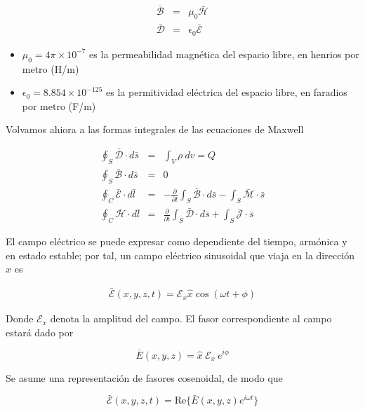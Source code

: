 \begin{eqnarray*}
\mathcal{\bar{B}} &=& \mu_0 \mathcal{\bar{H}} \\
\mathcal{\bar{D}} &=& \epsilon_0 \mathcal{\bar{E}} 
\end{eqnarray*}

\begin{itemize}
    \item $\mu_0 = 4 \pi \times 10 ^{-7}$ es la permeabilidad magnética del espacio libre, en henrios por metro (H/m)
    \item $\epsilon_0 = 8.854 \times 10^{-125}$ es la permitividad eléctrica del espacio libre, en faradios por metro (F/m) 
\end{itemize}

Volvamos ahiora a las formas integrales de las ecuaciones de Maxwell

\begin{eqnarray*}
\oint_S \mathcal{\bar{D}} \cdot d \bar{s} &=& \int_V \rho \ dv = Q \\
\oint_S \mathcal{\bar{B}} \cdot d \bar{s} &=& 0 \\
\oint_C \mathcal{\bar{E}} \cdot d \bar{l} &=& - \frac{\partial}{\partial t} \int_S \mathcal{\bar{B}} \cdot d \bar{s} - \int_S \mathcal{\bar{M}} \cdot \bar{s} \\
\oint_C \mathcal{\bar{H}} \cdot d \bar{l} &=& \frac{\partial}{\partial t} \int_S \mathcal{\bar{D}} \cdot d \bar{s} + \int_S \mathcal{\bar{J}} \cdot \bar{s} 
\end{eqnarray*}

El campo eléctrico se puede expresar como dependiente del tiempo, armónica y en estado estable; por tal, un campo eléctrico sinusoidal que viaja en la dirección $x$ es 

\begin{eqnarray*}
\mathcal{\bar{E}}(x,y,z,t) = \mathcal{E}_x \hat{x} \cos(\omega t + \phi)  
\end{eqnarray*}

Donde $\mathcal{E}_x$ denota la amplitud del campo. El fasor correspondiente al campo estará dado por

\begin{equation*}
\bar{E}(x,y,z) = \hat{x} \ \mathcal{E}_x \ e^{i \phi} 
\end{equation*}

Se asume una representación de fasores cosenoidal, de modo que 


\begin{equation*}
\mathcal{\bar{E}} (x,y,z,t) = \text{Re} \{ \bar{E}(x,y,z) e^{i \omega t} \}
\end{equation*}


